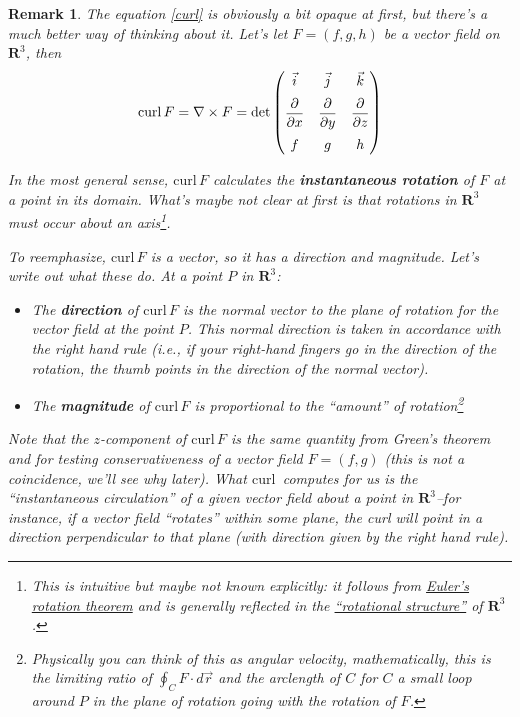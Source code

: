 \documentclass[12pt]{article}
\numberwithin{equation}{subsection}
\numberwithin{figure}{subsection}
\theoremstyle{note}
\newtheorem{remark}[subsection]{Remark}
\newcommand{\curl}{\mathrm{curl\,}}
\begin{document}
{\begin{remark}
	The equation \eqref{curl} is obviously a bit opaque at first, but there's a much better way of thinking about it. Let's let $F=(f,g,h)$ be a vector field on $\mathbf{R}^3$, then \begin{equation}
		\curl F= \nabla \times F = \det \begin{pmatrix} \vspace{2mm} \vec{i} & \vec{j} & \vec{k} \\ \vspace{2mm} \dfrac{\partial}{\partial x} & \dfrac{\partial}{\partial y}  &\dfrac{\partial}{\partial z} \\ f & g & h\end{pmatrix}
	\end{equation}


 In the most general sense, $\curl F$ calculates the \textbf{instantaneous rotation} of $F$ at a point in its domain. What's maybe not clear at first is that rotations in $\mathbf{R}^3$ must occur about an axis\footnote{This is intuitive but maybe not known explicitly: it follows from \href{https://en.wikipedia.org/wiki/Euler\%27s_rotation_theorem}{Euler's rotation theorem} and is generally reflected in the \href{https://en.wikipedia.org/wiki/3D_rotation_group}{``rotational structure''} of $\mathbf{R}^3$.}. 

To reemphasize, $\curl F$ is a \textit{vector}, so it has a direction and magnitude. Let's write out what these do. At a point $P$ in $\mathbf{R}^3$:
\begin{itemize}
	\item The \textbf{direction} of $\curl F$ is the normal vector to the plane of rotation for the vector field at the point $P$. This normal direction is taken in accordance with the \textit{right hand rule} (i.e., if your right-hand fingers go in the direction of the rotation, the thumb points in the direction of the normal vector).
	\item The \textbf{magnitude} of $\curl F$ is proportional to the ``amount'' of rotation\footnote{Physically you can think of this as angular velocity, mathematically, this is the limiting ratio of $\oint_C F\cdot d\vec{r}$ and the arclength of $C$ for $C$ a small loop around $P$ in the plane of rotation going \textit{with} the rotation of $F$.}
\end{itemize}
Note that the $z$-component of $\curl F$ is the same quantity from Green's theorem and for testing conservativeness of a vector field $F=(f,g)$ (this is not a coincidence, we'll see why later). What $\curl$ computes for us is the ``instantaneous circulation'' of a given vector field about a point in $\mathbf{R}^3$--for instance, if a vector field ``rotates'' within some plane, the curl will point in a direction perpendicular to that plane (with direction given by the right hand rule).
\end{remark}

}
\end{document}
